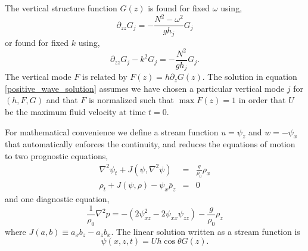 \documentclass{jfm}
\begin{document}
The vertical structure function $G(z)$ is found for fixed $\omega$ using,
\begin{equation}
\label{vertical-eigenvalue-G-with-omega}
\partial_{zz} G_j = -\frac{N^2-\omega^2}{g h_j }G_j
\end{equation}
or found for fixed $k$ using,
\begin{equation}
\label{vertical-eigenvalue-G-with-K}
\partial_{zz}G_j - k^2 G_j = -\frac{N^2}{g h_j }G_j.
\end{equation}
The vertical mode $F$ is related by $F(z) = h \partial_z G(z)$. The solution in equation \ref{positive_wave_solution} assumes we have chosen a particular vertical mode $j$ for $(h,F,G)$ and that $F$ is normalized such that $\max{F(z)}=1$ in order that $U$ be the maximum fluid velocity at time $t=0$.

For mathematical convenience we define a stream function $u=\psi_z$ and $w=-\psi_x$ that automatically enforces the continuity, and reduces the equations of motion to two prognostic equations,
\begin{eqnarray}
\label{streamfunction_equation}
\nabla^2 \psi_t +  J\left( \psi, \nabla^2 \psi \right) &=& \frac{g}{\rho_0}\rho_x \\ \label{rho_equation}
\rho_t + J\left( \psi, \rho \right) - \psi_x \bar{\rho}_z &=& 0
\end{eqnarray}
and one diagnostic equation,
\begin{equation}
\frac{1}{\rho_0} \nabla^2 p = -\left( 2 \psi_{xz}^2 - 2 \psi_{xx}\psi_{zz} \right) - \frac{g}{\rho_0} \rho_z
\end{equation}
where $J(a,b) \equiv a_x b_z - a_z b_x$. The linear solution written as a stream function is
\begin{equation}
\label{linear_streamfunction}
\psi(x,z,t) = U h \cos \theta G(z).
\end{equation}
\end{document}
